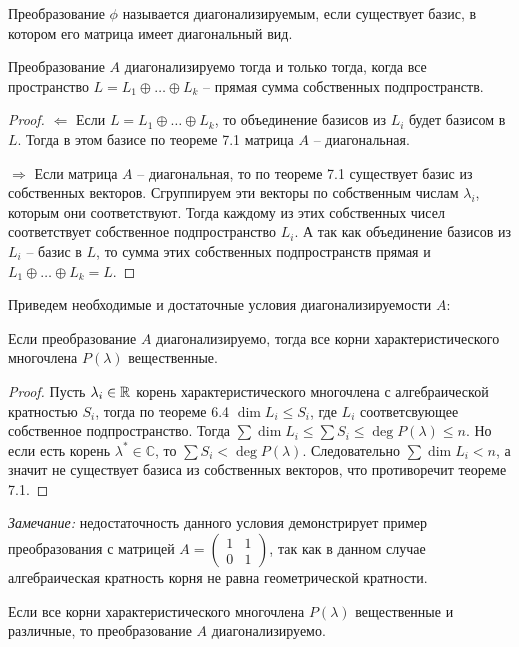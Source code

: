 \begin{definition}
    Преобразование $\phi$ называется диагонализируемым, если существует базис, в котором его матрица имеет диагональный вид.
\end{definition}
\begin{theorem}
    Преобразование $A$ диагонализируемо тогда и только тогда, когда все пространство $L=L_1\oplus\dots\oplus L_k$ -- прямая сумма собственных подпространств.
\end{theorem}
\begin{proof} 
$\Leftarrow$ Если $L=L_1\oplus\dots\oplus L_k$, то объединение базисов из $L_i$ будет базисом в $L$. Тогда в этом базисе по теореме 7.1 матрица $A$ -- диагональная.

$\Rightarrow$ Если матрица $A$ -- диагональная, то по теореме 7.1 существует базис из собственных векторов. Сгруппируем эти векторы по собственным числам $\lambda_i$, которым они соответствуют. Тогда каждому из этих собственных чисел соответствует собственное подпространство $L_i$. А так как  объединение базисов из $L_i$ -- базис в $L$, то сумма этих собственных подпространств прямая и $L_1\oplus\dots\oplus L_k=L$.
\end{proof}
Приведем необходимые и достаточные условия диагонализируемости $A$:
\begin{proposition} 
    Если преобразование $A$ диагонализируемо, тогда все корни характеристического многочлена $P(\lambda)$ вещественные.
\end{proposition}
\begin{proof}
    Пусть $\lambda_i\in \mathbb{R}$ корень характеристического многочлена с алгебраической кратностью  $S_i$, тогда по теореме 6.4 $\dim L_i\leqslant S_i$, где $L_i$ соответсвующее собственное подпространство. Тогда $\sum\dim L_i \leqslant \sum S_i\leqslant \deg P(\lambda)\leqslant n$. Но если есть корень $\lambda^{*}\in \mathbb{C}$, то $\sum S_i< \deg P(\lambda)$. Следовательно $\sum\dim L_i <n$, а значит не существует базиса из собственных векторов, что противоречит теореме 7.1.
\end{proof}
\textit{Замечание:} недостаточность данного условия демонстрирует пример преобразования с матрицей $A=\left(\begin{matrix}
    1&1\\0&1
\end{matrix}\right)$, так как в данном случае алгебраическая кратность корня не равна геометрической кратности.
\begin{proposition} 
    Если все корни характеристического многочлена $P(\lambda)$ вещественные и различные, то преобразование $A$ диагонализируемо.
\end{proposition}
